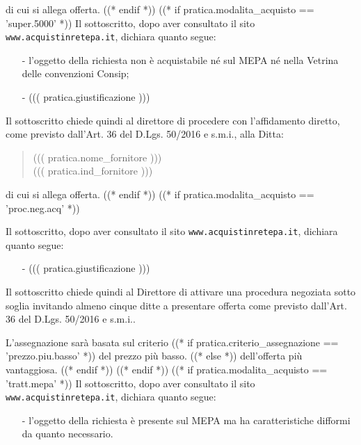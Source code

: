 \documentclass[a4paper,12pt]{letter}
\begin{document}
di cui si allega offerta.
((* endif *))
((* if pratica.modalita_acquisto == 'super.5000' *))
Il sottoscritto, dopo aver consultato il sito {\tt www.acquistinretepa.it},
dichiara quanto segue:

\begin{itemize}
\item[-] l'oggetto della richiesta non è acquistabile n\'e sul MEPA n\'e
	 nella Vetrina delle convenzioni Consip;
\item[-] ((( pratica.giustificazione )))
\end{itemize}
Il sottoscritto chiede quindi al direttore di procedere con l'affidamento diretto,
come previsto dall'Art. 36 del D.Lgs. 50/2016 e s.m.i., alla Ditta: 
\begin{quote}
((( pratica.nome_fornitore )))\\
((( pratica.ind_fornitore )))
\end{quote}

di cui si allega offerta.
((* endif *))
((* if pratica.modalita_acquisto == 'proc.neg.acq' *))

Il sottoscritto, dopo aver consultato il sito {\tt www.acquistinretepa.it},
dichiara quanto segue:

\begin{itemize}
\item[-] ((( pratica.giustificazione )))
\end{itemize}

Il sottoscritto chiede quindi al Direttore di attivare una procedura negoziata
sotto soglia invitando almeno cinque ditte a presentare offerta come previsto
dall'Art. 36 del D.Lgs. 50/2016 e s.m.i..

L'assegnazione sarà basata sul criterio %
   ((* if pratica.criterio_assegnazione == 'prezzo.piu.basso' *)) %
del prezzo più basso.
   ((* else *)) %
dell'offerta più vantaggiosa.
   ((* endif *))
((* endif *))
((* if pratica.modalita_acquisto == 'tratt.mepa' *))
Il sottoscritto, dopo aver consultato il sito {\tt www.acquistinretepa.it},
dichiara quanto segue:

\begin{itemize}
\item[-] l'oggetto della richiesta è presente sul MEPA ma ha caratteristiche difformi
da quanto necessario.
\end{itemize}
\end{document}
